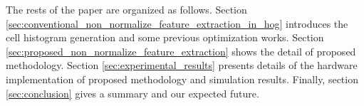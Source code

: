 The rests of the paper are organized as follows.
Section \ref{sec:conventional_non_normalize_feature_extraction_in_hog}
introduces the cell histogram generation and some previous optimization works.
Section \ref{sec:proposed_non_normalize_feature_extraction} shows the detail of
proposed methodology.
Section \ref{sec:experimental_results} presents details of the hardware
implementation of proposed methodology and simulation results.
Finally, section \ref{sec:conclusion} gives a summary and our expected
future.
